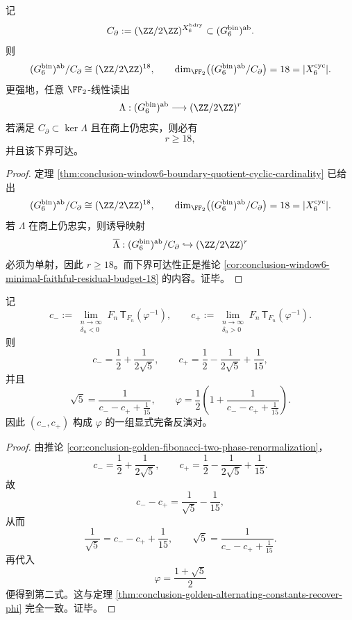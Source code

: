 \begin{corollary}\label{cor:conclusion-window6-boundary-stripped-residual-budget-cyclic-saturation}
记
\[
C_{\partial}:=(\ZZ/2\ZZ)^{X_6^{\mathrm{bdry}}}\subset (G_6^{\mathrm{bin}})^{\mathrm{ab}}.
\]
则
\[
(G_6^{\mathrm{bin}})^{\mathrm{ab}}/C_{\partial}\cong (\ZZ/2\ZZ)^{18},
\qquad
\dim_{\FF_2}\bigl((G_6^{\mathrm{bin}})^{\mathrm{ab}}/C_{\partial}\bigr)=18=|X_6^{\mathrm{cyc}}|.
\]
更强地，任意 \(\FF_2\)-线性读出
\[
\Lambda:(G_6^{\mathrm{bin}})^{\mathrm{ab}}\longrightarrow (\ZZ/2\ZZ)^r
\]
若满足 \(C_{\partial}\subset \ker\Lambda\) 且在商上仍忠实，则必有
\[
r\ge 18,
\]
并且该下界可达。
\end{corollary}
\begin{proof}
定理 \ref{thm:conclusion-window6-boundary-quotient-cyclic-cardinality} 已给出
\[
(G_6^{\mathrm{bin}})^{\mathrm{ab}}/C_{\partial}\cong (\ZZ/2\ZZ)^{18},
\qquad
\dim_{\FF_2}\bigl((G_6^{\mathrm{bin}})^{\mathrm{ab}}/C_{\partial}\bigr)=18=|X_6^{\mathrm{cyc}}|.
\]
若 \(\Lambda\) 在商上仍忠实，则诱导映射
\[
\overline\Lambda:(G_6^{\mathrm{bin}})^{\mathrm{ab}}/C_{\partial}\hookrightarrow (\ZZ/2\ZZ)^r
\]
必须为单射，因此 \(r\ge 18\)。而下界可达性正是推论 \ref{cor:conclusion-window6-minimal-faithful-residual-budget-18} 的内容。证毕。
\end{proof}

\begin{theorem}[黄金二相极限常数的完备反演对]\label{thm:conclusion-window6-golden-two-phase-constants-complete-inversion-pair}
记
\[
c_-:=
\lim_{\substack{n\to\infty\\ \delta_n<0}}
F_n\,\mathsf T_{F_n}(\varphi^{-1}),
\qquad
c_+:=
\lim_{\substack{n\to\infty\\ \delta_n>0}}
F_n\,\mathsf T_{F_n}(\varphi^{-1}).
\]
则
\[
c_-=\frac12+\frac{1}{2\sqrt5},
\qquad
c_+=\frac12-\frac{1}{2\sqrt5}+\frac1{15},
\]
并且
\[
\sqrt5=\frac{1}{c_--c_++\frac1{15}},
\qquad
\varphi=\frac12\left(1+\frac{1}{c_--c_++\frac1{15}}\right).
\]
因此 \((c_-,c_+)\) 构成 \(\varphi\) 的一组显式完备反演对。
\end{theorem}
\begin{proof}
由推论 \ref{cor:conclusion-golden-fibonacci-two-phase-renormalization}，
\[
c_-=\frac12+\frac{1}{2\sqrt5},
\qquad
c_+=\frac12-\frac{1}{2\sqrt5}+\frac1{15}.
\]
故
\[
c_--c_+=\frac1{\sqrt5}-\frac1{15},
\]
从而
\[
\frac1{\sqrt5}=c_--c_++\frac1{15},
\qquad
\sqrt5=\frac{1}{c_--c_++\frac1{15}}.
\]
再代入
\[
\varphi=\frac{1+\sqrt5}{2}
\]
便得到第二式。这与定理 \ref{thm:conclusion-golden-alternating-constants-recover-phi} 完全一致。证毕。
\end{proof}

